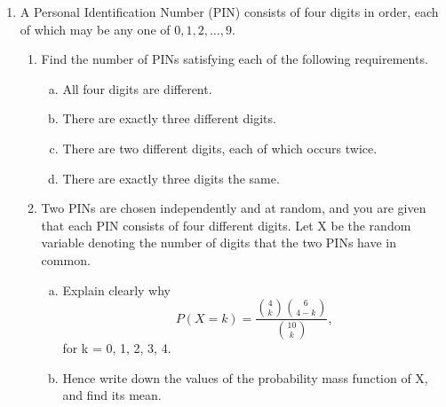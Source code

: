 \documentclass[a4paper,12pt]{article}
\begin{document}
\begin{enumerate}
\item A Personal Identification Number (PIN) consists of four digits in order, each of which may be any one of $0, 1, 2, \ldots, 9$.

\begin{enumerate}
\item Find the number of PINs satisfying each of the following requirements.

\begin{enumerate}[(a)]
\item All four digits are different.
\item There are exactly three different digits.
\item There are two different digits, each of which occurs twice.
\item There are exactly three digits the same.
\end{enumerate}
\item Two PINs are chosen independently and at random, and you are given that each PIN consists of four different digits. Let X be the random variable denoting the number of digits that the two PINs have in common.

\begin{enumerate}[(a)]
\item Explain clearly why \[P(X = k) = \frac{{4 \choose k} {6 \choose 4-k}}{{10 \choose k}}  ,\] for k = 0, 1, 2, 3, 4.




\item Hence write down the values of the probability mass function of X, and find its mean.

\end{enumerate}
\end{enumerate}



\end{enumerate}
\end{document}
